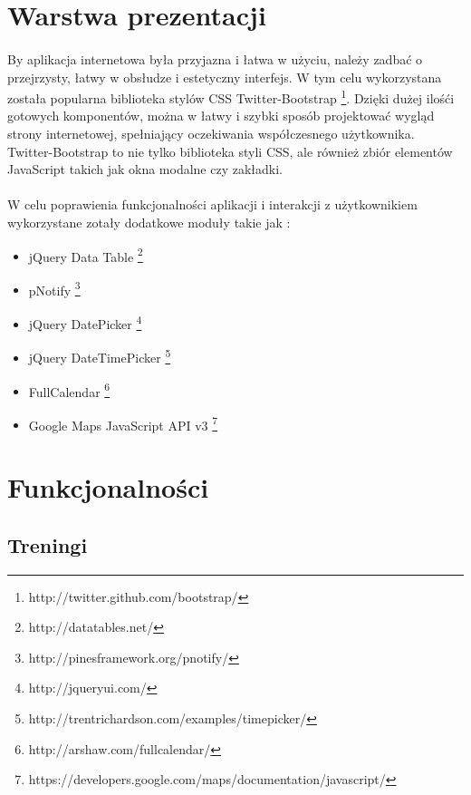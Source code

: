 \section{Warstwa prezentacji} %
\label{sec:warstwa_aplikacji}
\paragraph{} %
\label{par:}
By aplikacja internetowa była przyjazna i łatwa w użyciu, należy zadbać o przejrzysty, łatwy w obsłudze i estetyczny interfejs. W tym celu wykorzystana została popularna biblioteka stylów CSS Twitter-Bootstrap \footnote{http://twitter.github.com/bootstrap/}. Dzięki dużej ilośći gotowych komponentów, można w łatwy i szybki sposób projektować wygląd strony internetowej, spełniający oczekiwania współczesnego użytkownika. Twitter-Bootstrap to nie tylko biblioteka styli CSS, ale również zbiór elementów JavaScript takich jak okna modalne czy zakładki.

\paragraph{} %
\label{par:}
W celu poprawienia funkcjonalności aplikacji i interakcji z użytkownikiem wykorzystane zotały dodatkowe moduły takie jak :
\begin{itemize}
\item jQuery Data Table \footnote{http://datatables.net/}
\item pNotify \footnote{http://pinesframework.org/pnotify/}
\item jQuery DatePicker \footnote{http://jqueryui.com/}
\item jQuery DateTimePicker \footnote{http://trentrichardson.com/examples/timepicker/}
\item FullCalendar \footnote{http://arshaw.com/fullcalendar/}
\item Google Maps JavaScript API v3 \footnote{https://developers.google.com/maps/documentation/javascript/}
\end{itemize}


\section{Funkcjonalności} %
\label{sec:funkcjonalno_ci}

\subsection{Treningi} %
\label{sub:treningi}

